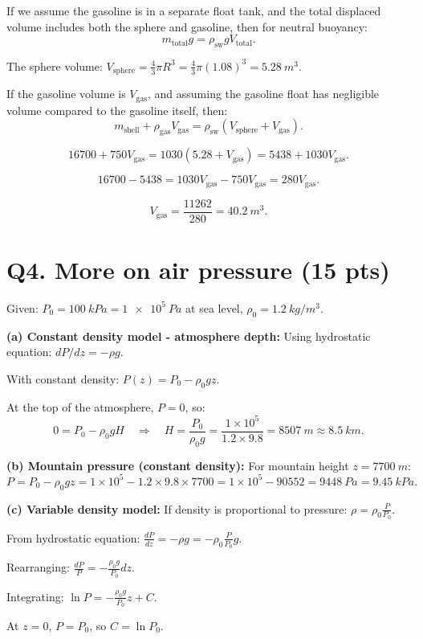 \documentclass[11pt]{article}
\newcommand{\ans}[1]{\boxed{\displaystyle #1}}
\begin{document}
If we assume the gasoline is in a separate float tank, and the total displaced volume includes both the sphere and gasoline, then for neutral buoyancy:
\[ m_{\text{total}} g = \rho_{\text{sw}} g V_{\text{total}}. \]

The sphere volume: $V_{\text{sphere}} = \frac{4}{3}\pi R^3 = \frac{4}{3}\pi (1.08)^3 = \SI{5.28}{m^3}$.

If the gasoline volume is $V_{\text{gas}}$, and assuming the gasoline float has negligible volume compared to the gasoline itself, then:
\[ m_{\text{shell}} + \rho_{\text{gas}} V_{\text{gas}} = \rho_{\text{sw}}(V_{\text{sphere}} + V_{\text{gas}}). \]

\[ 16700 + 750 V_{\text{gas}} = 1030(5.28 + V_{\text{gas}}) = 5438 + 1030 V_{\text{gas}}. \]

\[ 16700 - 5438 = 1030 V_{\text{gas}} - 750 V_{\text{gas}} = 280 V_{\text{gas}}. \]

\[ V_{\text{gas}} = \frac{11262}{280} = \ans{\SI{40.2}{m^3}}. \]

\section*{Q4. More on air pressure (15 pts)}
Given: $P_0 = \SI{100}{kPa} = \SI{1e5}{Pa}$ at sea level, $\rho_0 = \SI{1.2}{kg/m^3}$.

\textbf{(a) Constant density model - atmosphere depth:} Using hydrostatic equation: $dP/dz = -\rho g$.

With constant density: $P(z) = P_0 - \rho_0 g z$.

At the top of the atmosphere, $P = 0$, so:
\[ 0 = P_0 - \rho_0 g H \quad\Rightarrow\quad H = \frac{P_0}{\rho_0 g} = \frac{1 \times 10^5}{1.2 \times 9.8} = \ans{\SI{8507}{m} \approx \SI{8.5}{km}}. \]

\textbf{(b) Mountain pressure (constant density):} For mountain height $z = \SI{7700}{m}$:
\[ P = P_0 - \rho_0 g z = 1 \times 10^5 - 1.2 \times 9.8 \times 7700 = 1 \times 10^5 - 90552 = \ans{\SI{9448}{Pa} = \SI{9.45}{kPa}}. \]

\textbf{(c) Variable density model:} If density is proportional to pressure: $\rho = \rho_0 \frac{P}{P_0}$.

From hydrostatic equation: $\frac{dP}{dz} = -\rho g = -\rho_0 \frac{P}{P_0} g$.

Rearranging: $\frac{dP}{P} = -\frac{\rho_0 g}{P_0} dz$.

Integrating: $\ln P = -\frac{\rho_0 g}{P_0} z + C$.

At $z = 0$, $P = P_0$, so $C = \ln P_0$.
\end{document}
